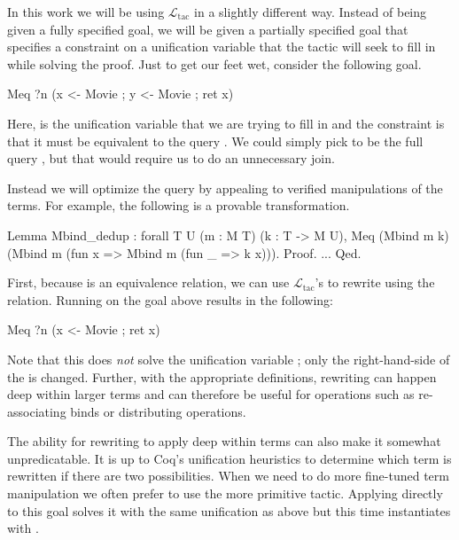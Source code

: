 \documentclass[preprint]{sigplanconf}
\newcommand{\ltac}[0]{\ensuremath{\mathcal{L}_{\mathrm{tac}}}}
\begin{document}
In this work we will be using \ltac{} in a slightly different way.
Instead of being given a fully specified goal, we will be given a partially specified goal that specifies a constraint on a unification variable that the tactic will seek to fill in while solving the proof.
Just to get our feet wet, consider the following goal.
\begin{coq}
Meq ?n (x <- Movie ; y <- Movie ; ret x)
\end{coq}
Here,  is the unification variable that we are trying to fill in and the constraint is that it must be equivalent to the query .
We could simply pick  to be the full query , but that would require us to do an unnecessary join.

Instead we will optimize the query by appealing to verified manipulations of the terms.
For example, the following is a provable transformation.
\begin{coq}
Lemma Mbind_dedup : forall {T U} (m : M T) (k : T -> M U),
  Meq (Mbind m k) (Mbind m (fun x => Mbind m (fun _ => k x))).
Proof. ... Qed.
\end{coq}
First, because  is an equivalence relation, we can use \ltac's  to rewrite using the relation.
Running  on the goal above results in the following:
\begin{coq}
Meq ?n (x <- Movie ; ret x)
\end{coq}
Note that this does \emph{not} solve the unification variable ; only the right-hand-side of the  is changed.
Further, with the appropriate definitions, rewriting can happen deep within larger terms and can therefore be useful for operations such as re-associating binds or distributing operations.

The ability for rewriting to apply deep within terms can also make it somewhat unpredicatable.
It is up to Coq's unification heuristics to determine which term is rewritten if there are two possibilities.
When we need to do more fine-tuned term manipulation we often prefer to use the more primitive  tactic.
Applying  directly to this goal solves it with the same unification as above but this time instantiates  with .
\end{document}
